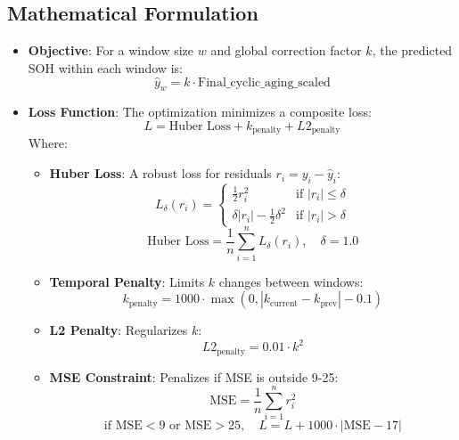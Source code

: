 \subsection{Mathematical Formulation}
\begin{itemize}
    \item \textbf{Objective}: For a window size \(w\) and global correction factor \(k\), the predicted SOH within each window is:
    \[
    \hat{y}_{w} = k \cdot \text{Final_cyclic_aging_scaled}
    \]
    \item \textbf{Loss Function}: The optimization minimizes a composite loss:
    \[
    L = \text{Huber Loss} + k_{\text{penalty}} + L2_{\text{penalty}}
    \]
    Where:
    \begin{itemize}
        \item \textbf{Huber Loss}: A robust loss for residuals \(r_i = y_i - \hat{y}_i\):
        \[
        L_\delta(r_i) = 
        \begin{cases} 
        \frac{1}{2} r_i^2 & \text{if } |r_i| \leq \delta \\
        \delta |r_i| - \frac{1}{2} \delta^2 & \text{if } |r_i| > \delta 
        \end{cases}
        \]
        \[
        \text{Huber Loss} = \frac{1}{n} \sum_{i=1}^{n} L_\delta(r_i), \quad \delta = 1.0
        \]
        \item \textbf{Temporal Penalty}: Limits \(k\) changes between windows:
        \[
        k_{\text{penalty}} = 1000 \cdot \max(0, |k_{\text{current}} - k_{\text{prev}}| - 0.1)
        \]
        \item \textbf{L2 Penalty}: Regularizes \(k\):
        \[
        L2_{\text{penalty}} = 0.01 \cdot k^2
        \]
        \item \textbf{MSE Constraint}: Penalizes if MSE is outside 9-25:
        \[
        \text{MSE} = \frac{1}{n} \sum_{i=1}^{n} r_i^2
        \]
        \[
        \text{if } \text{MSE} < 9 \text{ or } \text{MSE} > 25, \quad L = L + 1000 \cdot |\text{MSE} - 17|
        \]
    \end{itemize}
\end{itemize}

